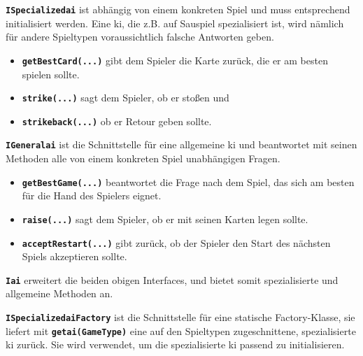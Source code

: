 \documentclass[
							a4paper, 
							11pt, 
							openany, 
							liststotoc,
							parskip=half, 
   							headings=normal
						]{scrreprt}
\begin{document}
{\textbf{\texttt{ISpecialized\acs{ai}}} ist abhängig von einem konkreten Spiel und muss entsprechend initialisiert werden. Eine \acs{ki}, die z.B. auf Sauspiel spezialisiert ist, wird nämlich für andere Spieltypen voraussichtlich falsche Antworten geben.
\begin{itemize}
	\item \textbf{\texttt{getBestCard(...)}} gibt dem Spieler die Karte zurück, die er am besten spielen sollte.
	\item \textbf{\texttt{strike(...)}} sagt dem Spieler, ob er stoßen und
	\item \textbf{\texttt{strikeback(...)}} ob er Retour geben sollte.
\end{itemize}\bigskip

\textbf{\texttt{IGeneral\acs{ai}}} ist die Schnittstelle für eine allgemeine \acs{ki} und beantwortet mit seinen Methoden alle von einem konkreten Spiel unabhängigen Fragen.
\begin{itemize}
	\item \textbf{\texttt{getBestGame(...)}} beantwortet die Frage nach dem Spiel, das sich am besten für die Hand des Spielers eignet.
	\item \textbf{\texttt{raise(...)}} sagt dem Spieler, ob er mit seinen Karten legen sollte.
	\item \textbf{\texttt{acceptRestart(...)}} gibt zurück, ob der Spieler den Start des nächsten Spiels akzeptieren sollte.
\end{itemize}\bigskip

\textbf{\texttt{I\acs{ai}}} erweitert die beiden obigen Interfaces, und bietet somit spezialisierte und allgemeine Methoden an.

\textbf{\texttt{ISpecialized\acs{ai}Factory}} ist die Schnittstelle für eine statische Factory-Klasse, sie liefert mit \textbf{\texttt{get\acs{ai}(GameType)}} eine auf den Spieltypen zugeschnittene, spezialisierte \acs{ki} zurück. Sie wird verwendet, um die spezialisierte \acs{ki} passend zu initialisieren.

}
\end{document}
